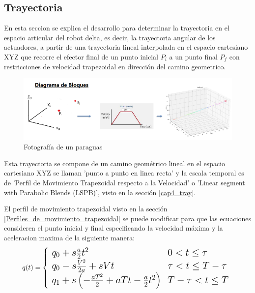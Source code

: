     \newpage

    \subsection{Trayectoria}
    
    En esta seccion se explica el desarrollo para determinar la trayectoria en el espacio articular del robot delta, es decir, la trayectoria angular de los actuadores, a partir de una trayectoria lineal interpolada en el espacio cartesiano XYZ que recorre el efector final de un punto inicial $P_i$ a un punto final $P_f$ con restricciones de velocidad trapezoidal en dirección del camino geometrico.

     \begin{figure}[htb]
            \centering
            \includegraphics[width=0.9\linewidth]{Main/Chapter6/Images6/cap6_trayectory_1.png}
            \caption{Fotografía de un paraguas}
            \label{f:cap6_trayectory_1}
        \end{figure}    
        
    Esta trayectoria se compone de un camino geométrico lineal en el espacio cartesiano XYZ se llaman 'punto a punto en linea recta' y la escala temporal es de 'Perfil de Movimiento Trapezoidal respecto a la Velocidad' o 'Linear segment with Parabolic Blends (LSPB)', visto en la sección \ref{cap4_tray}. 
    
    El perfil de movimiento trapezoidal visto en la sección \ref{Perfiles_de_movimiento_trapezoidal} se puede modificar para que las ecuaciones consideren el punto inicial y final especificando la velocidad máxima y la aceleracion maxima de la siguiente manera:
        \begin{equation}
        \Large
            q(t) = \left\lbrace
                \begin{array}{ll}
                q_0 + s\frac{a}{2}t^2&   0< t \leq \tau\\
                q_0 - s\frac{V^2}{2a}+sVt &  \tau< t \leq T- \tau\\
                q_1 + s \left( -\frac{aT^2}{2}+aTt-\frac{a}{2}t^2 \right) &  T- \tau< t \leq T\\
            \end{array}
            \right.
            \label{eq:cap6_tray_1}
        \end{equation}
    
